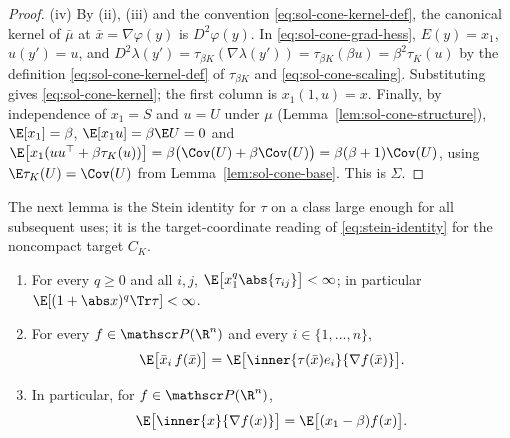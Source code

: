 \documentclass[../main.tex]{subfiles}
\begin{document}
\begin{proof}
(iv) By (ii), (iii) and the convention \eqref{eq:sol-cone-kernel-def}, the canonical kernel of
$\bar\mu$ at $\bar x=\nabla\varphi(y)$ is $D^2\varphi(y)$.  In \eqref{eq:sol-cone-grad-hess},
$E(y)=x_1$, $u(y')=u$, and $D^2\lambda(y')=\tau_{\beta K}(\nabla\lambda(y'))=\tau_{\beta K}(\beta u)
=\beta^2\tau_K(u)$ by the definition \eqref{eq:sol-cone-kernel-def} of $\tau_{\beta K}$ and
\eqref{eq:sol-cone-scaling}.  Substituting gives \eqref{eq:sol-cone-kernel}; the first column
is $x_1(1,u)=x$.  Finally, by independence of $x_1=S$ and $u=U$ under $\mu$
(Lemma~\ref{lem:sol-cone-structure}), $\E[x_1]=\beta$, $\E[x_1u]=\beta\E U=0$ and
$\E\bigl[x_1(uu^\top+\beta\tau_K(u))\bigr]=\beta\bigl(\Cov(U)+\beta\Cov(U)\bigr)
=\beta(\beta+1)\Cov(U)$, using $\E\tau_K(U)=\Cov(U)$ from Lemma~\ref{lem:sol-cone-base}.
This is $\Sigma$.
\end{proof}

The next lemma is the Stein identity for $\tau$ on a class large enough for all subsequent
uses; it is the target-coordinate reading of \eqref{eq:stein-identity} for the noncompact
target $C_K$.

\begin{lemma}
\label{lem:sol-cone-stein}
\begin{enumerate}[label=(\alph*),leftmargin=2.2em]
  \item For every $q\ge0$ and all $i,j$, $\E\bigl[x_1^{q}\abs{\tau_{ij}}\bigr]<\infty$; in
  particular $\E[(1+\abs x)^{q}\Tr\tau]<\infty$.
  \item For every $f\in\mathscr P(\R^n)$ and every $i\in\{1,\dots,n\}$,
  \begin{equation}
    \E\bigl[\bar x_i\,f(\bar x)\bigr]=\E\bigl[\inner{\tau(\bar x)e_i}{\nabla f(\bar x)}\bigr].
    \label{eq:sol-cone-stein}
  \end{equation}
  \item In particular, for $f\in\mathscr P(\R^n)$,
  \begin{equation}
    \E\bigl[\inner{x}{\nabla f(x)}\bigr]=\E\bigl[(x_1-\beta)f(x)\bigr].
    \label{eq:sol-cone-radial}
  \end{equation}
\end{enumerate}
\end{lemma}
\end{document}
